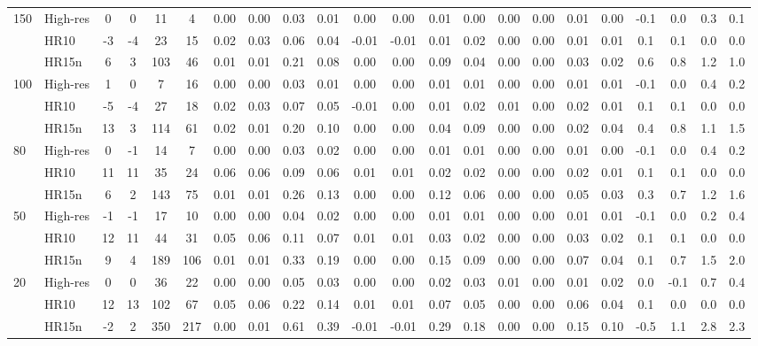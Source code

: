 \documentclass[fleqn,usenatbib]{mnras}
\begin{document}
\begin{table*}
{\begin{tabular}{llcccccccccccccccccccc}
\multirow{3}{*}{150} & High-res & 0  & 0  & 11  & 4   & 0.00 & 0.00 & 0.03 & 0.01 & 0.00  & 0.00  & 0.01 & 0.00 & 0.00 & 0.00 & 0.01 & 0.00 & -0.1 & 0.0 & 0.3 & 0.1 \\
                     & HR10     & -3 & -4 & 23  & 15  & 0.02 & 0.03 & 0.06 & 0.04 & -0.01 & -0.01 & 0.01 & 0.02 & 0.00 & 0.00 & 0.01 & 0.01 & 0.1  & 0.1 & 0.0 & 0.0 \\
                     & HR15n    & 6  & 3  & 103 & 46  & 0.01 & 0.01 & 0.21 & 0.08 & 0.00  & 0.00  & 0.09 & 0.04 & 0.00 & 0.00 & 0.03 & 0.02 & 0.6  & 0.8 & 1.2 & 1.0 \\
\hline
\multirow{3}{*}{100} & High-res & 1  & 0  & 7   & 16  & 0.00 & 0.00 & 0.03 & 0.01 & 0.00  & 0.00 & 0.01 & 0.01 & 0.00 & 0.00 & 0.01 & 0.01 & -0.1 & 0.0 & 0.4 & 0.2 \\
                     & HR10     & -5 & -4 & 27  & 18  & 0.02 & 0.03 & 0.07 & 0.05 & -0.01 & 0.00 & 0.01 & 0.02 & 0.01 & 0.00 & 0.02 & 0.01 & 0.1  & 0.1 & 0.0 & 0.0 \\
                     & HR15n    & 13 & 3  & 114 & 61  & 0.02 & 0.01 & 0.20 & 0.10 & 0.00  & 0.00 & 0.04 & 0.09 & 0.00 & 0.00 & 0.02 & 0.04 & 0.4  & 0.8 & 1.1 & 1.5 \\
\hline
\multirow{3}{*}{80}  & High-res & 0  & -1 & 14  & 7   & 0.00 & 0.00 & 0.03 & 0.02 & 0.00  & 0.00 & 0.01 & 0.01 & 0.00 & 0.00 & 0.01 & 0.00 & -0.1 & 0.0 & 0.4 & 0.2 \\
                     & HR10     & 11 & 11 & 35  & 24  & 0.06 & 0.06 & 0.09 & 0.06 & 0.01  & 0.01 & 0.02 & 0.02 & 0.00 & 0.00 & 0.02 & 0.01 & 0.1  & 0.1 & 0.0 & 0.0 \\
                     & HR15n    & 6  & 2  & 143 & 75  & 0.01 & 0.01 & 0.26 & 0.13 & 0.00  & 0.00 & 0.12 & 0.06 & 0.00 & 0.00 & 0.05 & 0.03 & 0.3  & 0.7 & 1.2 & 1.6 \\
\hline
\multirow{3}{*}{50}  & High-res & -1 & -1 & 17  & 10  & 0.00 & 0.00 & 0.04 & 0.02 & 0.00  & 0.00 & 0.01 & 0.01 & 0.00 & 0.00 & 0.01 & 0.01 & -0.1 & 0.0 & 0.2 & 0.4 \\
                     & HR10     & 12 & 11 & 44  & 31  & 0.05 & 0.06 & 0.11 & 0.07 & 0.01  & 0.01 & 0.03 & 0.02 & 0.00 & 0.00 & 0.03 & 0.02 & 0.1  & 0.1 & 0.0 & 0.0 \\
                     & HR15n    & 9  & 4  & 189 & 106 & 0.01 & 0.01 & 0.33 & 0.19 & 0.00  & 0.00 & 0.15 & 0.09 & 0.00 & 0.00 & 0.07 & 0.04 & 0.1  & 0.7 & 1.5 & 2.0 \\
\hline
\multirow{3}{*}{20}  & High-res & 0  & 0  & 36  & 22  & 0.00 & 0.00 & 0.05 & 0.03 & 0.00  & 0.00  & 0.02 & 0.03 & 0.01 & 0.00 & 0.01 & 0.02 & 0.0 & -0.1 & 0.7 & 0.4 \\
                     & HR10     & 12 & 13 & 102 & 67  & 0.05 & 0.06 & 0.22 & 0.14 & 0.01  & 0.01  & 0.07 & 0.05 & 0.00 & 0.00 & 0.06 & 0.04 & 0.1 & 0.0  & 0.0 & 0.0 \\
                     & HR15n    & -2 & 2  & 350 & 217 & 0.00 & 0.01 & 0.61 & 0.39 & -0.01 & -0.01 & 0.29 & 0.18 & 0.00 & 0.00 & 0.15 & 0.10 & -0.5 & 1.1 & 2.8 & 2.3 \\
\hline
\end{tabular}}
\end{table*}
\end{document}
